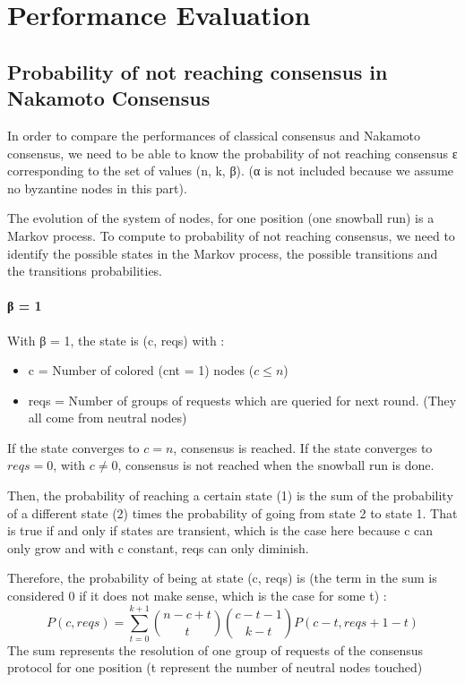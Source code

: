 \documentclass[11pt, twocolumn]{article}
\begin{document}
\section{Performance Evaluation}
\subsection{Probability of not reaching consensus in Nakamoto Consensus}

In order to compare the performances of classical consensus and Nakamoto consensus, we need to be able to know the probability of not reaching consensus ε corresponding to the set
of values (n, k, β). (α is not included because we assume no byzantine nodes in this part).

The evolution of the system of nodes, for one position (one snowball run) is a Markov process. To compute to probability of not reaching consensus, we need to identify the possible states in the
Markov process, the possible transitions and the transitions probabilities.

\paragraph{β = 1}
With β = 1, the state is (c, reqs) with :
\begin{itemize}
    \item c = Number of colored (cnt = 1) nodes ($c \leq n$)
    \item reqs = Number of groups of requests which are queried for next round. (They all come from neutral nodes)
\end{itemize}
If the state converges to $c = n$, consensus is reached.
If the state converges to $reqs = 0$, with $c \neq 0$, consensus is not reached when the snowball run is done.

Then, the probability of reaching a certain state (1) is the sum of the probability of a different state (2) times the probability of going from state 2 to state 1.
That is true if and only if states are transient, which is the case here because c can only grow and with c constant, reqs can only diminish.

Therefore, the probability of being at state (c, reqs) is (the term in the sum is considered 0 if it does not make sense, which is the case for some t) :
\begin{equation*}
    P(c, reqs) = \sum_{t=0}^{k+1} {n-c+t \choose t}{c-t-1 \choose k-t}P(c-t, reqs+1-t)
\end{equation*}
The sum represents the resolution of one group of requests of the consensus protocol for one position (t represent the number of neutral nodes touched)
\end{document}
